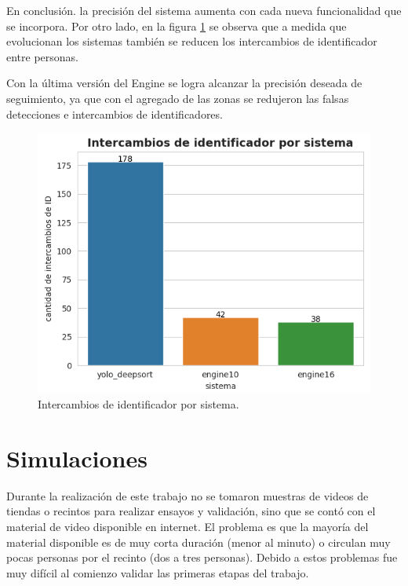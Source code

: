 En conclusión. la precisión del sistema aumenta con cada nueva funcionalidad que se incorpora. Por otro lado, en la figura \ref{fig:idSwitch} se observa que a medida que evolucionan los sistemas también se reducen los intercambios de identificador entre personas.

Con la última versión del Engine se logra alcanzar la precisión deseada de seguimiento, ya que con el agregado de las zonas se redujeron las falsas detecciones e intercambios de identificadores.

\begin{figure}[ht]
	\centering
	\includegraphics[scale=.80]{./Figures/idSwitch.png}
	\caption{Intercambios de identificador por sistema.}
	\label{fig:idSwitch}
\end{figure}

\newpage


\section{Simulaciones}
\label{sec:simulaciones}

Durante la realización de este trabajo no se tomaron muestras de videos de tiendas o recintos para realizar ensayos y validación, sino que se contó con el material de video disponible en internet. El problema es que la mayoría del material disponible es de muy corta duración (menor al minuto) o circulan muy pocas personas por el recinto (dos a tres personas). Debido a estos problemas fue muy difícil al comienzo validar las primeras etapas del trabajo.

